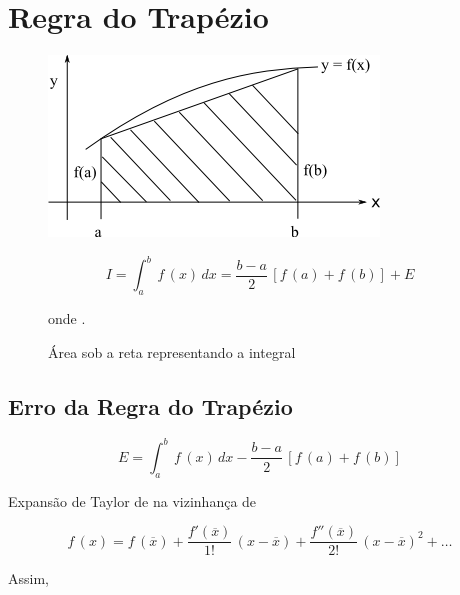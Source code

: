 \section{Regra do Trapézio}

\begin{figure}[htb]
 \centering
\begin{minipage}[c]{7cm}
    \includegraphics[scale=0.8]{capitulos/capitulo2/figuras/regra_trapezio1.png}
    \caption{Área sob a reta representando a integral}
    \label{fig:regra_trapezio1}
 \end{minipage}\hspace*{1cm}
 \begin{minipage}[c]{6cm}
    \begin{equation}
     \label{cap2:sec2:eq1}
     I = \int_a^b \, f\,(x) \, dx = \frac{b - a}{2} \, [f\,(a) + f\,(b)] + E
    \end{equation}

    onde .
 \end{minipage}
\end{figure}

\subsection{Erro da Regra do Trapézio}

\[
 E = \int_a^b \, f\,(x) \, dx - \frac{b - a}{2} \, [f\,(a) + f\,(b)]
\]

Expansão de Taylor de  na vizinhança de 

\[
 f\,(x) = f\,(\overline{x}) + \frac{f'(\overline{x})}{1!} \, (x - \overline{x}) + \frac{f''(\overline{x})}{2!} \, (x - \overline{x})^2 + \ldots
\]

Assim,

